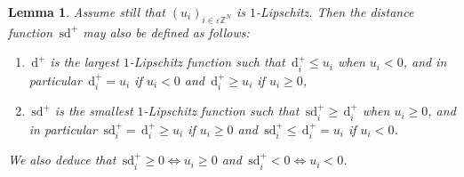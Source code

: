 \documentclass[10pt,a4paper]{amsart}
\newtheorem{lemma}{Lemma}
\newcommand{\Z}{\mathbb{Z}}
\newcommand{\e}{\varepsilon}
\newcommand{\ez}{\e\Z^N}
\newcommand{\sd}{\,\mathrm{sd}}
\newcommand{\ud}{\,\mathrm{d}}
\begin{document}
\begin{lemma}\label{lem:defsd}
 {Assume still that $(u_i)_{i\in\ez}$ is $1$-Lipschitz. Then}
  the distance function $\sd^+$ may also be defined as follows:
  \begin{enumerate} 
  \item $\ud^+$ is the largest $1$-Lipschitz function such that $\ud^+_i\le u_i$ when
    $u_i<0$, and in particular $\ud^+_i=u_i$ if $u_i<0$ and $\ud^+_i\ge u_i$ if $u_i\ge 0$,
  \item $\sd^+$ is the smallest $1$-Lipschitz function such that $\sd^+_i\ge \ud^+_i$
    when $u_i\ge 0$, and in particular $\sd^+_i=\ud^+_i\ge u_i$ if $u_i\ge 0$ and $\sd^+_i\le \ud^+_i=u_i$
    if $u_i<0$.
  \end{enumerate}
  We also deduce that $\sd_i^+\ge 0\Leftrightarrow u_i\ge 0$ and
  $\sd_i^+< 0 \Leftrightarrow u_i<0$.
\end{lemma}
\end{document}
